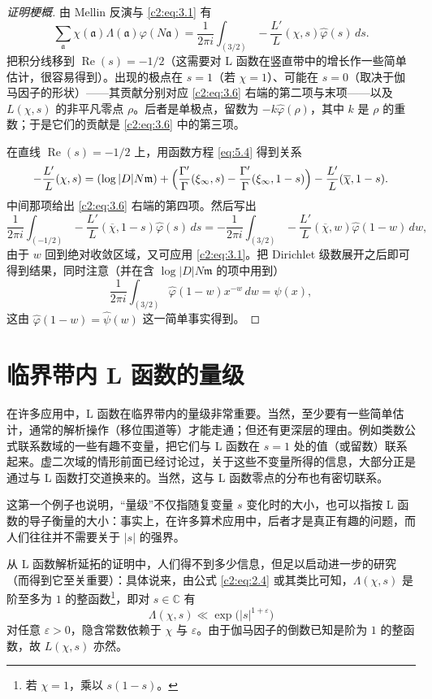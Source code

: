 \begin{proof}[证明梗概]
由 Mellin 反演与 \eqref{c2:eq:3.1} 有
\[
\sum_{\mathfrak{a}}\chi(\mathfrak{a})\Lambda(\mathfrak{a})\varphi(N\mathfrak{a})=\frac{1}{2\pi i}\int_{(3/2)}-\frac{L'}{L}(\chi,s)\hat\varphi(s)\,ds.
\]
把积分线移到 $\operatorname{Re}(s)=-1/2$（这需要对 L 函数在竖直带中的增长作一些简单估计，很容易得到）。出现的极点在 $s=1$（若 $\chi=1$）、可能在 $s=0$（取决于伽马因子的形状）——其贡献分别对应 \eqref{c2:eq:3.6} 右端的第二项与末项——以及 $L(\chi,s)$ 的非平凡零点 $\rho$。后者是单极点，留数为 $-k\hat\varphi(\rho)$，其中 $k$ 是 $\rho$ 的重数；于是它们的贡献是 \eqref{c2:eq:3.6} 中的第三项。

在直线 $\operatorname{Re}(s)=-1/2$ 上，用函数方程 \eqref{eq:5.4} 得到关系
\[
-\frac{L'}{L}(\chi,s)=(\log|D|N\mathfrak{m})+\Bigl(\frac{\Gamma'}{\Gamma}(\xi_\infty,s)-\frac{\Gamma'}{\Gamma}(\xi_\infty,1-s)\Bigr)-\frac{L'}{L}(\overline{\chi},1-s).
\]
中间那项给出 \eqref{c2:eq:3.6} 右端的第四项。然后写出
\[
\frac{1}{2\pi i}\int_{(-1/2)}-\frac{L'}{L}(\overline{\chi},1-s)\hat\varphi(s)\,ds=-\frac{1}{2\pi i}\int_{(3/2)}-\frac{L'}{L}(\overline{\chi},w)\hat\varphi(1-w)\,dw,
\]
由于 $w$ 回到绝对收敛区域，又可应用 \eqref{c2:eq:3.1}。把 Dirichlet 级数展开之后即可得到结果，同时注意（并在含 $\log|D|N\mathfrak{m}$ 的项中用到）
\[
\frac{1}{2\pi i}\int_{(3/2)}\hat\varphi(1-w)x^{-w}\,dw=\psi(x),
\]
这由 $\hat\varphi(1-w)=\hat\psi(w)$ 这一简单事实得到。
\end{proof}

\section{临界带内 L 函数的量级}\label{c2:sec:4}

在许多应用中，L 函数在临界带内的量级非常重要。当然，至少要有一些简单估计，通常的解析操作（移位围道等）才能走通；但还有更深层的理由。例如类数公式联系数域的一些有趣不变量，把它们与 L 函数在 $s=1$ 处的值（或留数）联系起来。虚二次域的情形前面已经讨论过，关于这些不变量所得的信息，大部分正是通过与 L 函数打交道换来的。当然，这与 L 函数零点的分布也有密切联系。

这第一个例子也说明，“量级”不仅指随复变量 $s$ 变化时的大小，也可以指按 L 函数的导子衡量的大小：事实上，在许多算术应用中，后者才是真正有趣的问题，而人们往往并不需要关于 $|s|$ 的强界。

从 L 函数解析延拓的证明中，人们得不到多少信息，但足以启动进一步的研究（而得到它至关重要）：具体说来，由公式 \eqref{c2:eq:2.4} 或其类比可知，$\Lambda(\chi,s)$ 是阶至多为 $1$ 的整函数\footnote{若 $\chi=1$，乘以 $s(1-s)$。}，即对 $s\in\mathbb{C}$ 有
\[
\Lambda(\chi,s)\ll\exp\bigl(|s|^{1+\varepsilon}\bigr)
\]
对任意 $\varepsilon>0$，隐含常数依赖于 $\chi$ 与 $\varepsilon$。由于伽马因子的倒数已知是阶为 $1$ 的整函数，故 $L(\chi,s)$ 亦然。

